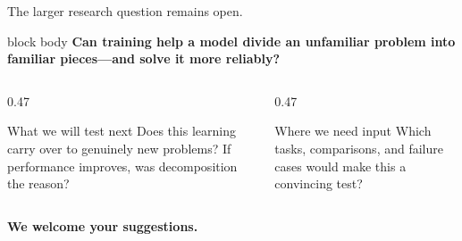\documentclass[aspectratio=169,11pt]{beamer}
\begin{document}
\begin{frame}{The larger research question remains open.}
  \begin{beamercolorbox}[wd=\linewidth,sep=.6em,rounded=true]{block body}
    \centering
    \large\textbf{Can training help a model divide an unfamiliar problem into familiar
    pieces---and solve it more reliably?}
  \end{beamercolorbox}

  \vspace{0.55cm}
  \begin{columns}[T,onlytextwidth]
    \begin{column}{0.47\textwidth}
      \begin{block}{What we will test next}
        Does this learning carry over to genuinely new problems? If performance improves, was
        decomposition the reason?
      \end{block}
    \end{column}
    \begin{column}{0.47\textwidth}
      \begin{block}{Where we need input}
        Which tasks, comparisons, and failure cases would make this a convincing test?
      \end{block}
    \end{column}
  \end{columns}

  \vspace{0.45cm}
  \centering
  {\large\color{RlmTeal}\textbf{We welcome your suggestions.}}
\end{frame}
\end{document}
